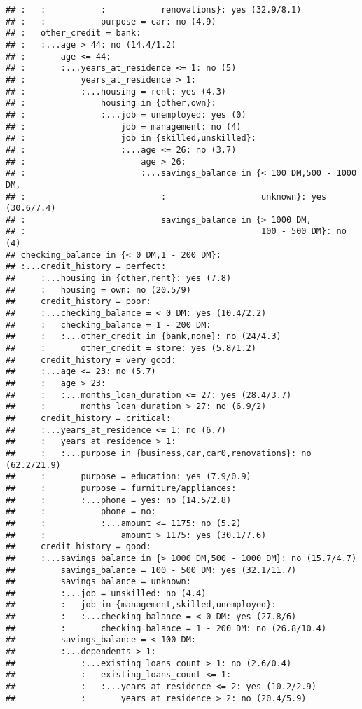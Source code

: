 \documentclass[
]{article}
\begin{document}
\begin{verbatim}
## :   :           :           renovations}: yes (32.9/8.1)
## :   :           purpose = car: no (4.9)
## :   other_credit = bank:
## :   :...age > 44: no (14.4/1.2)
## :       age <= 44:
## :       :...years_at_residence <= 1: no (5)
## :           years_at_residence > 1:
## :           :...housing = rent: yes (4.3)
## :               housing in {other,own}:
## :               :...job = unemployed: yes (0)
## :                   job = management: no (4)
## :                   job in {skilled,unskilled}:
## :                   :...age <= 26: no (3.7)
## :                       age > 26:
## :                       :...savings_balance in {< 100 DM,500 - 1000 DM,
## :                           :                   unknown}: yes (30.6/7.4)
## :                           savings_balance in {> 1000 DM,
## :                                               100 - 500 DM}: no (4)
## checking_balance in {< 0 DM,1 - 200 DM}:
## :...credit_history = perfect:
##     :...housing in {other,rent}: yes (7.8)
##     :   housing = own: no (20.5/9)
##     credit_history = poor:
##     :...checking_balance = < 0 DM: yes (10.4/2.2)
##     :   checking_balance = 1 - 200 DM:
##     :   :...other_credit in {bank,none}: no (24/4.3)
##     :       other_credit = store: yes (5.8/1.2)
##     credit_history = very good:
##     :...age <= 23: no (5.7)
##     :   age > 23:
##     :   :...months_loan_duration <= 27: yes (28.4/3.7)
##     :       months_loan_duration > 27: no (6.9/2)
##     credit_history = critical:
##     :...years_at_residence <= 1: no (6.7)
##     :   years_at_residence > 1:
##     :   :...purpose in {business,car,car0,renovations}: no (62.2/21.9)
##     :       purpose = education: yes (7.9/0.9)
##     :       purpose = furniture/appliances:
##     :       :...phone = yes: no (14.5/2.8)
##     :           phone = no:
##     :           :...amount <= 1175: no (5.2)
##     :               amount > 1175: yes (30.1/7.6)
##     credit_history = good:
##     :...savings_balance in {> 1000 DM,500 - 1000 DM}: no (15.7/4.7)
##         savings_balance = 100 - 500 DM: yes (32.1/11.7)
##         savings_balance = unknown:
##         :...job = unskilled: no (4.4)
##         :   job in {management,skilled,unemployed}:
##         :   :...checking_balance = < 0 DM: yes (27.8/6)
##         :       checking_balance = 1 - 200 DM: no (26.8/10.4)
##         savings_balance = < 100 DM:
##         :...dependents > 1:
##             :...existing_loans_count > 1: no (2.6/0.4)
##             :   existing_loans_count <= 1:
##             :   :...years_at_residence <= 2: yes (10.2/2.9)
##             :       years_at_residence > 2: no (20.4/5.9)

\end{verbatim}
\end{document}

